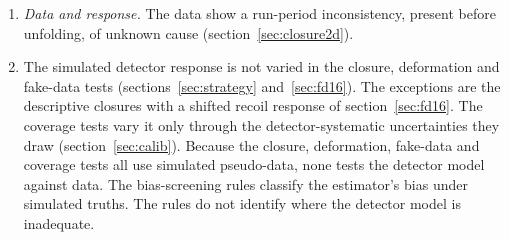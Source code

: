 \begin{enumerate}
The per-cell coverage readings cited are pointwise, for each reported quantity separately. Simultaneous coverage of all reported quantities is not graded. The joint readings grade the fraction of pseudo-experiments whose $\chi^2$ lies in the test's joint region. The covariances are estimated from finite ensembles, and their sampling precision is not quantified.
\item \emph{Data and response.} The data show a run-period inconsistency, present before unfolding, of unknown cause (section~\ref{sec:closure2d}).
\item The simulated detector response is not varied in the closure, deformation and fake-data tests (sections~\ref{sec:strategy} and~\ref{sec:fd16}). The exceptions are the descriptive closures with a shifted recoil response of section~\ref{sec:fd16}. The coverage tests vary it only through the detector-systematic uncertainties they draw (section~\ref{sec:calib}). Because the closure, deformation, fake-data and coverage tests all use simulated pseudo-data, none tests the detector model against data. The bias-screening rules classify the estimator's bias under simulated truths. The rules do not identify where the detector model is inadequate.
\end{enumerate}

\clearpage

